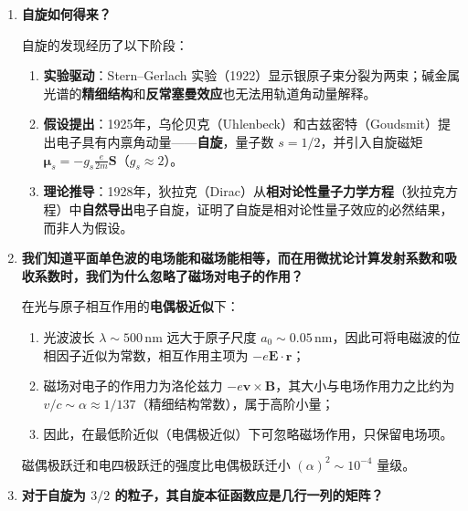\begin{enumerate}[label=\textbf{\arabic*.}, leftmargin=2em, itemsep=0.8em]
这一性质是厄米算符定义的直接推论，与具体基组的选择无关——这正是狄拉克符号体系的优势：算符的厄米性是一个与表象无关的抽象性质。

\item \textbf{自旋如何得来？}

自旋的发现经历了以下阶段：
\begin{enumerate}[nosep, label=(\arabic*)]
    \item \textbf{实验驱动}：Stern--Gerlach 实验（1922）显示银原子束分裂为两束；碱金属光谱的\textbf{精细结构}和\textbf{反常塞曼效应}也无法用轨道角动量解释。
    \item \textbf{假设提出}：1925年，乌伦贝克（Uhlenbeck）和古兹密特（Goudsmit）提出电子具有内禀角动量——\textbf{自旋}，量子数 $s=1/2$，并引入自旋磁矩 $\boldsymbol{\mu}_s = -g_s\frac{e}{2m}\mathbf{S}$（$g_s\approx 2$）。
    \item \textbf{理论推导}：1928年，狄拉克（Dirac）从\textbf{相对论性量子力学方程}（狄拉克方程）中\textbf{自然导出}电子自旋，证明了自旋是相对论性量子效应的必然结果，而非人为假设。
\end{enumerate}

\item \textbf{我们知道平面单色波的电场能和磁场能相等，而在用微扰论计算发射系数和吸收系数时，我们为什么忽略了磁场对电子的作用？}

在光与原子相互作用的\textbf{电偶极近似}下：
\begin{enumerate}[nosep, label=(\arabic*)]
    \item 光波波长 $\lambda \sim 500\,$nm 远大于原子尺度 $a_0 \sim 0.05\,$nm，因此可将电磁波的位相因子近似为常数，相互作用主项为 $-e\mathbf{E}\cdot\mathbf{r}$；
    \item 磁场对电子的作用力为洛伦兹力 $-e\mathbf{v}\times\mathbf{B}$，其大小与电场作用力之比约为 $v/c \sim \alpha \approx 1/137$（精细结构常数），属于高阶小量；
    \item 因此，在最低阶近似（电偶极近似）下可忽略磁场作用，只保留电场项。
\end{enumerate}
磁偶极跃迁和电四极跃迁的强度比电偶极跃迁小 $(\alpha)^2 \sim 10^{-4}$ 量级。

\item \textbf{对于自旋为 $3/2$ 的粒子，其自旋本征函数应是几行一列的矩阵？}


\end{enumerate}
